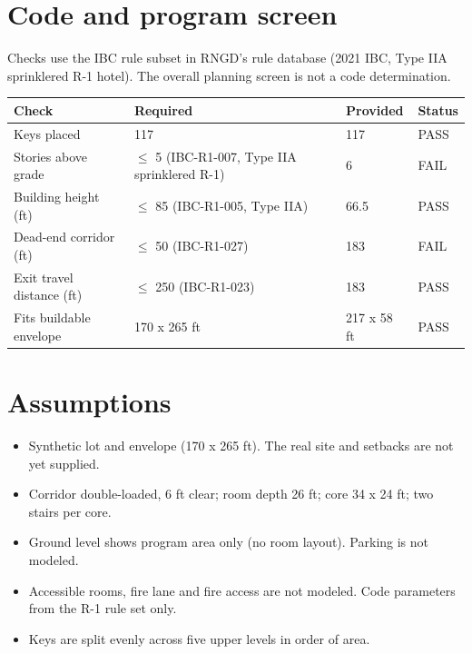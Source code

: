 \documentclass[10pt]{article}
\begin{document}
\section{Code and program screen}
Checks use the IBC rule subset in RNGD's rule database (2021 IBC, Type IIA sprinklered R-1 hotel). The overall planning screen is not a code determination.
\begin{longtable}{p{4.2cm}p{4.6cm}p{3cm}l}\toprule
Check & Required & Provided & Status \\ \midrule
\endhead
Keys placed & 117 & 117 & PASS \\
Stories above grade & $\le$ 5 (IBC-R1-007, Type IIA sprinklered R-1) & 6 & FAIL \\
Building height (ft) & $\le$ 85 (IBC-R1-005, Type IIA) & 66.5 & PASS \\
Dead-end corridor (ft) & $\le$ 50 (IBC-R1-027) & 183 & FAIL \\
Exit travel distance (ft) & $\le$ 250 (IBC-R1-023) & 183 & PASS \\
Fits buildable envelope & 170 x 265 ft & 217 x 58 ft & PASS \\
\bottomrule
\end{longtable}

\section{Assumptions}
\begin{itemize}
\item Synthetic lot and envelope (170 x 265 ft). The real site and setbacks are not yet supplied.
\item Corridor double-loaded, 6 ft clear; room depth 26 ft; core 34 x 24 ft; two stairs per core.
\item Ground level shows program area only (no room layout). Parking is not modeled.
\item Accessible rooms, fire lane and fire access are not modeled. Code parameters from the R-1 rule set only.
\item Keys are split evenly across five upper levels in order of area.
\end{itemize}
\end{document}
